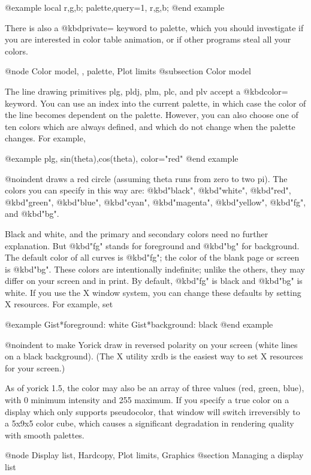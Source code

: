 @example
local r,g,b;
palette,query=1, r,g,b;
@end example

There is also a @kbd{private=} keyword to palette, which you should
investigate if you are interested in color table animation, or if
other programs steal all your colors.

@node Color model,  , palette, Plot limits
@subsection Color model

The line drawing primitives plg, pldj, plm, plc, and plv accept a
@kbd{color=} keyword.  You can use an index into the current palette, in
which case the color of the line becomes dependent on the palette.
However, you can also choose one of ten colors which are always
defined, and which do not change when the palette changes.  For
example,

@example
plg, sin(theta),cos(theta), color="red"
@end example

@noindent
draws a red circle (assuming theta runs from zero to two pi).  The
colors you can specify in this way are: @kbd{"black"}, @kbd{"white"},
@kbd{"red"}, @kbd{"green"}, @kbd{"blue"}, @kbd{"cyan"}, @kbd{"magenta"},
@kbd{"yellow"}, @kbd{"fg"}, and @kbd{"bg"}.

Black and white, and the primary and secondary colors need no further
explanation.  But @kbd{"fg"} stands for foreground and @kbd{"bg"} for
background.  The default color of all curves is @kbd{"fg"}; the color of
the blank page or screen is @kbd{"bg"}.  These colors are intentionally
indefinite; unlike the others, they may differ on your screen and in
print.  By default, @kbd{"fg"} is black and @kbd{"bg"} is white.  If you
use the X window system, you can change these defaults by setting X
resources.  For example, set

@example
Gist*foreground: white
Gist*background: black
@end example

@noindent
to make Yorick draw in reversed polarity on your screen (white lines
on a black background).  (The X utility xrdb is the easiest way to set
X resources for your screen.)

As of yorick 1.5, the color may also be an array of three values (red,
green, blue), with 0 minimum intensity and 255 maximum.  If you specify
a true color on a display which only supports pseudocolor, that window
will switch irreversibly to a 5x9x5 color cube, which causes a
significant degradation in rendering quality with smooth palettes.

@node Display list, Hardcopy, Plot limits, Graphics
@section Managing a display list

